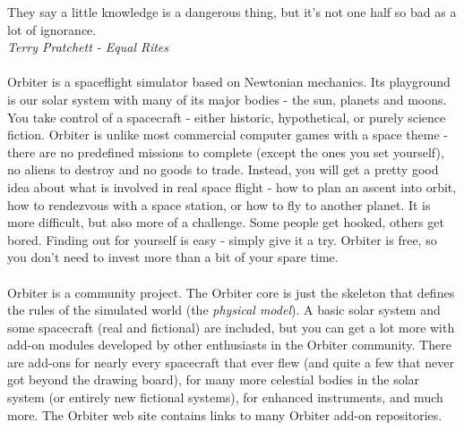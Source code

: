 \documentclass[Orbiter User Manual.tex]{subfiles}
\begin{document}
They say a little knowledge is a dangerous thing, but it's not one half so bad as a lot of ignorance.\\
\textit{Terry Pratchett - Equal Rites}\\
\\
Orbiter is a spaceflight simulator based on Newtonian mechanics. Its playground is our solar system with many of its major bodies - the sun, planets and moons. You take control of a spacecraft - either historic, hypothetical, or purely science fiction. Orbiter is unlike most commercial computer games with a space theme - there are no predefined missions to complete (except the ones you set yourself), no aliens to destroy and no goods to trade. Instead, you will get a pretty good idea about what is involved in real space flight - how to plan an ascent into orbit, how to rendezvous with a space station, or how to fly to another planet. It is more difficult, but also more of a challenge. Some people get hooked, others get bored. Finding out for yourself is easy - simply give it a try. Orbiter is free, so you don't need to invest more than a bit of your spare time.\\
\\
Orbiter is a community project. The Orbiter core is just the skeleton that defines the rules of the simulated world (the \textit{physical model}). A basic solar system and some spacecraft (real and fictional) are included, but you can get a lot more with add-on modules developed by other enthusiasts in the Orbiter community. There are add-ons for nearly every spacecraft that ever flew (and quite a few that never got beyond the drawing board), for many more celestial bodies in the solar system (or entirely new fictional systems), for enhanced instruments, and much more. The Orbiter web site contains links to many Orbiter add-on repositories.
\end{document}
